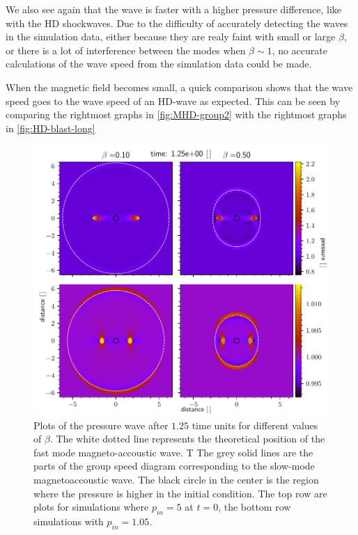 We also see again that the wave is faster with a higher pressure difference, like with the HD shockwaves. 
Due to the difficulty of accurately detecting the waves in the simulation data, either because they are realy faint with small or large $\beta$, or there is a lot of interference between the modes when $\beta \sim 1$, no accurate calculations of the wave speed from the simulation data could be made.

When the magnetic field becomes small, a quick comparison shows that the wave speed goes to the wave speed of an HD-wave as expected.
This can be seen by comparing the rightmost graphs in \cref{fig:MHD-group2} with the rightmost graphs in \cref{fig:HD-blast-long}

\begin{figure}[H]
	\centering
	\includegraphics[width=\linewidth]{images/group-speed-pressure1.pdf}
	\caption{Plots of the pressure wave after $1.25$ time units for different values of $\beta$. 
	The white dotted line represents the theoretical position of the fast mode magneto-accoustic wave. T
	The grey solid lines are the parts of the group speed diagram corresponding to the slow-mode magnetoaccoustic wave.
	The black circle in the center is the region where the pressure is higher in the initial condition.
	The top row are plots for simulations where $p_{in}=5$ at $t=0$, the bottom row simulations with $p_{in}=1.05$.}
	\label{fig:MHD-group1}
\end{figure}

